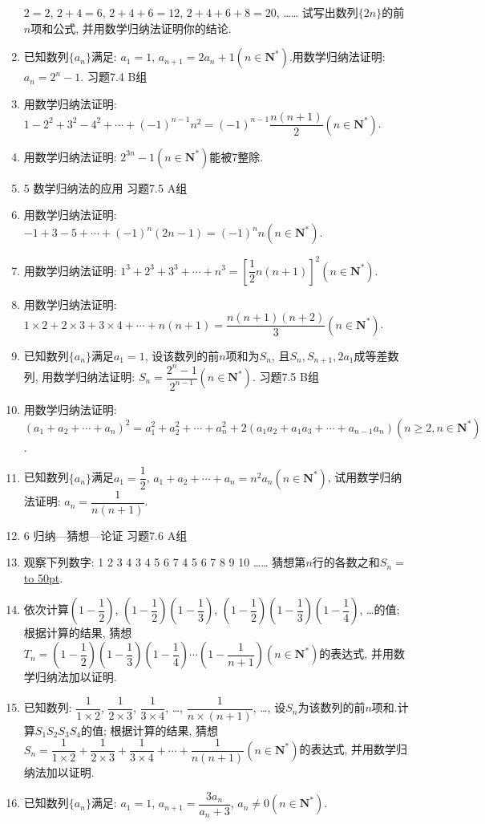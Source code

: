 \documentclass[10pt,a4paper]{article}
\newcommand{\blank}[1]{\underline{\hbox to #1pt{}}}
\begin{document}
\begin{enumerate}[1.]
$2=2$,
$2+4=6$,
$2+4+6=12$,
$2+4+6+8=20$,
……
试写出数列$\{2n\}$的前$n$项和公式, 并用数学归纳法证明你的结论.
\item 已知数列$\{a_n\}$满足: $a_1=1$, $a_{n+1}=2a_n+1(n\in \mathbf{N}^*)$.用数学归纳法证明: $a_n=2^n-1$.
习题7.4  B组
\item 用数学归纳法证明: $1-2^2+3^2-4^2+\cdots +(-1)^{n-1}n^2=(-1)^{n-1}\dfrac{n(n+1)}2(n\in \mathbf{N}^*)$.
\item 用数学归纳法证明: $2^{3n}-1(n\in \mathbf{N}^*)$能被7整除.
\item 5  数学归纳法的应用
习题7.5  A组
\item 用数学归纳法证明: $-1+3-5+\cdots +(-1)^n(2n-1)=(-1)^nn(n\in \mathbf{N}^*)$.
\item 用数学归纳法证明: $1^3+2^3+3^3+\cdots +n^3=[\dfrac 12n(n+1)]^2(n\in \mathbf{N}^*)$.
\item 用数学归纳法证明: $1\times 2+2\times 3+3\times 4+\cdots +n(n+1)=\dfrac{n(n+1)(n+2)}3(n\in \mathbf{N}^*)$.
\item 已知数列$\{a_n\}$满足$a_1=1$, 设该数列的前$n$项和为$S_n$, 且$S_n,S_{n+1},2a_1$成等差数列, 用数学归纳法证明: $S_n=\dfrac{{2^n}-1}{{2^{n-1}}}(n\in \mathbf{N}^*)$.
习题7.5  B组
\item 用数学归纳法证明:
$(a_1+a_2+\cdots +a_n)^2=a_1^2+a_2^2+\cdots +a_n^2+2(a_1a_2+a_1a_3+\cdots +a_{n-1}a_n)(n\ge 2,n\in \mathbf{N}^*)$.
\item 已知数列$\{a_n\}$满足$a_1=\dfrac 12$, $a_1+a_2+\cdots +a_n=n^2a_n(n\in \mathbf{N}^*)$, 试用数学归纳法证明: $a_n=\dfrac 1{n(n+1)}$.
\item 6  归纳—猜想—论证
习题7.6  A组
\item 观察下列数字:
1
2  3  4
3  4  5  6  7
4  5  6  7  8  9  10
……
猜想第$n$行的各数之和$S_n=$\blank{50}.
\item 依次计算$(1-\dfrac 12)$, $(1-\dfrac 12)(1-\dfrac 13)$, $(1-\dfrac 12)(1-\dfrac 13)(1-\dfrac 14)$, …的值; 根据计算的结果, 猜想$T_n=(1-\dfrac 12)(1-\dfrac 13)(1-\dfrac 14)\cdots (1-\dfrac 1{n+1})(n\in \mathbf{N}^*)$的表达式, 并用数学归纳法加以证明.
\item 已知数列: $\dfrac 1{1\times 2}$, $\dfrac 1{2\times 3}$, $\dfrac 1{3\times 4}$, …, $\dfrac 1{n\times (n+1)}$, …, 设$S_n$为该数列的前$n$项和.计算$S_1S_2S_3S_4$的值; 根据计算的结果, 猜想$S_n=\dfrac 1{1\times 2}+\dfrac 1{2\times 3}+\dfrac 1{3\times 4}+\cdots +\dfrac 1{n(n+1)}(n\in \mathbf{N}^*)$的表达式, 并用数学归纳法加以证明.
\item 已知数列$\{a_n\}$满足: $a_1=1$, $a_{n+1}=\dfrac{3{a_n}}{{a_n}+3}$, $a_n\ne 0(n\in \mathbf{N}^*)$.

\end{enumerate}
\end{document}
